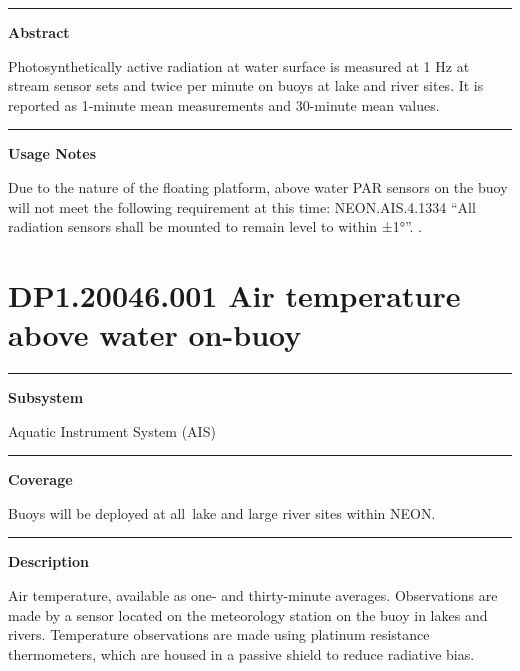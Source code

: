 \documentclass[]{article}
\begin{document}
\begin{center}\rule{0.5\linewidth}{\linethickness}\end{center}

\textbf{Abstract}

Photosynthetically active radiation at water surface is measured at 1 Hz
at stream sensor sets and twice per minute on buoys at lake and river
sites. It is reported as 1-minute mean measurements and 30-minute mean
values.

\begin{center}\rule{0.5\linewidth}{\linethickness}\end{center}

\textbf{Usage Notes}

Due to the nature of the floating platform, above water PAR sensors on
the buoy will not meet the following requirement at this time:
NEON.AIS.4.1334 ``All radiation sensors shall be mounted to remain level
to within ±1°''. \newpage
.

\section{DP1.20046.001 Air temperature above water
on-buoy}\label{dp1.20046.001-air-temperature-above-water-on-buoy}

\begin{center}\rule{0.5\linewidth}{\linethickness}\end{center}

\textbf{Subsystem}

Aquatic Instrument System (AIS)

\begin{center}\rule{0.5\linewidth}{\linethickness}\end{center}

\textbf{Coverage}

Buoys will be deployed at all~lake and large river sites within NEON.

\begin{center}\rule{0.5\linewidth}{\linethickness}\end{center}

\textbf{Description}

Air temperature, available as one- and thirty-minute averages.
Observations are made by a sensor located on the meteorology station on
the buoy in lakes and rivers. Temperature observations are made using
platinum resistance thermometers, which are housed in a passive shield
to reduce radiative bias.
\end{document}
